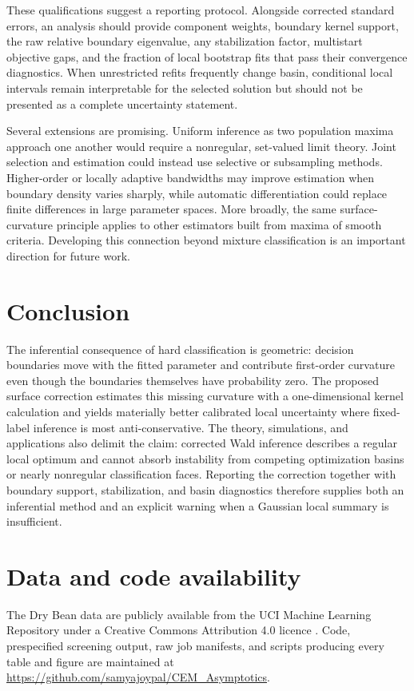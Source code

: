 \documentclass[12pt,a4paper]{article}
\theoremstyle{definition}
\theoremstyle{remark}
\begin{document}
These qualifications suggest a reporting protocol.  Alongside corrected
standard errors, an analysis should provide component weights, boundary kernel
support, the raw relative boundary eigenvalue, any stabilization factor,
multistart objective gaps, and the fraction of local bootstrap fits that pass
their convergence diagnostics.  When unrestricted refits frequently change
basin, conditional local intervals remain interpretable for the selected
solution but should not be presented as a complete uncertainty statement.

Several extensions are promising.  Uniform inference as two population maxima
approach one another would require a nonregular, set-valued limit theory.
Joint selection and estimation could instead use selective or subsampling
methods.  Higher-order or locally adaptive bandwidths may improve estimation
when boundary density varies sharply, while automatic differentiation could
replace finite differences in large parameter spaces.  More broadly, the same
surface-curvature principle applies to other estimators built from maxima of
smooth criteria.  Developing this connection beyond mixture classification is
an important direction for future work.

\section{Conclusion}
The inferential consequence of hard classification is geometric: decision
boundaries move with the fitted parameter and contribute first-order
curvature even though the boundaries themselves have probability zero. The
proposed surface correction estimates this missing curvature with a
one-dimensional kernel calculation and yields materially better calibrated
local uncertainty where fixed-label inference is most anti-conservative. The
theory, simulations, and applications also delimit the claim: corrected Wald
inference describes a regular local optimum and cannot absorb instability from
competing optimization basins or nearly nonregular classification faces.
Reporting the correction together with boundary support, stabilization, and
basin diagnostics therefore supplies both an inferential method and an
explicit warning when a Gaussian local summary is insufficient.

\section*{Data and code availability}
The Dry Bean data are publicly available from the UCI Machine Learning
Repository under a Creative Commons Attribution 4.0 licence
\citep{uci2020drybean}. Code, prespecified screening output, raw job manifests,
and scripts producing every table and figure are maintained at
\url{https://github.com/samyajoypal/CEM_Asymptotics}.
\end{document}
